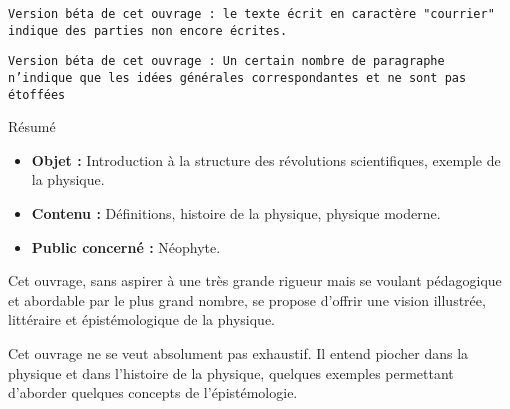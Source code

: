 
\texttt{Version béta de cet ouvrage : le texte écrit en caractère "courrier" indique des parties non encore écrites.}

\vspace{.3cm}

\texttt{Version béta de cet ouvrage : Un certain nombre de paragraphe n'indique que les idées générales correspondantes et ne sont pas étoffées}

\begin{center}
\Large
Résumé
\normalsize
\end{center}
\vspace{3cm}
\begin{itemize}[leftmargin=1cm, label=, itemsep=21pt]
\item {\bf Objet : } Introduction à la structure des révolutions scientifiques, exemple de la physique.
\item {\bf Contenu : } Définitions, histoire de la physique, physique moderne.
\item {\bf Public concerné : } Néophyte.
\end{itemize}

\vspace{3cm}




Cet ouvrage, sans aspirer à une très grande rigueur mais se voulant pédagogique et abordable par le plus grand nombre, se propose d'offrir une vision illustrée, littéraire et épistémologique de la physique.

\vspace{.3cm}

Cet ouvrage ne se veut absolument pas exhaustif. Il entend piocher dans la physique et dans l'histoire de la physique, quelques exemples permettant d'aborder quelques concepts de l'épistémologie.

\vspace{.3cm}





